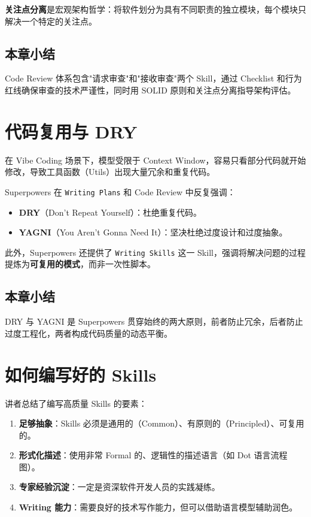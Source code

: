 \documentclass[a4paper]{article}
\begin{document}
\textbf{关注点分离}是宏观架构哲学：将软件划分为具有不同职责的独立模块，每个模块只解决一个特定的关注点。

\subsection{本章小结}

Code Review 体系包含"请求审查"和"接收审查"两个 Skill，通过 Checklist 和行为红线确保审查的技术严谨性，同时用 SOLID 原则和关注点分离指导架构评估。


\section{代码复用与 DRY}

在 Vibe Coding 场景下，模型受限于 Context Window，容易只看部分代码就开始修改，导致工具函数（Utils）出现大量冗余和重复代码。

Superpowers 在 \texttt{Writing Plans} 和 Code Review 中反复强调：

\begin{itemize}
    \item \textbf{DRY}（Don't Repeat Yourself）：杜绝重复代码。
    \item \textbf{YAGNI}（You Aren't Gonna Need It）：坚决杜绝过度设计和过度抽象。
\end{itemize}

此外，Superpowers 还提供了 \texttt{Writing Skills} 这一 Skill，强调将解决问题的过程提炼为\textbf{可复用的模式}，而非一次性脚本。

\subsection{本章小结}

DRY 与 YAGNI 是 Superpowers 贯穿始终的两大原则，前者防止冗余，后者防止过度工程化，两者构成代码质量的动态平衡。


\section{如何编写好的 Skills}

讲者总结了编写高质量 Skills 的要素：

\begin{enumerate}
    \item \textbf{足够抽象}：Skills 必须是通用的（Common）、有原则的（Principled）、可复用的。
    \item \textbf{形式化描述}：使用非常 Formal 的、逻辑性的描述语言（如 Dot 语言流程图）。
    \item \textbf{专家经验沉淀}：一定是资深软件开发人员的实践凝练。
    \item \textbf{Writing 能力}：需要良好的技术写作能力，但可以借助语言模型辅助润色。
\end{enumerate}
\end{document}
